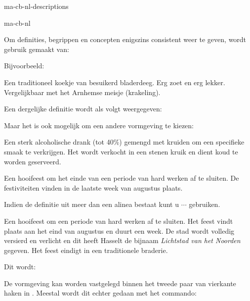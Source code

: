 \startonderdeel ma-cb-nl-descriptions

\produkt ma-cb-nl




Om definities, begrippen en concepten enigszins consistent
weer te geven, wordt gebruik gemaakt van:


Bijvoorbeeld:

\startbuffer
\doordefinieren
  [concept]
  [plaats=aanelkaar,kopletter=vet,breedte=ruim]

 Een traditioneel koekje van
besuikerd bladerdeeg. Erg zoet en erg lekker. Vergelijkbaar
met het Arnhemse meisje (krakeling). \par
\stopbuffer

\typebuffer

Een dergelijke definitie wordt als volgt weergegeven:

\haalbuffer

Maar het is ook mogelijk om een andere vormgeving te kiezen:

\startbuffer
\doordefinieren
  [concept]
  [plaats=boven,
   kopletter=vet,
   breedte=ruim,
   letter=schuin]

 Een sterk alcoholische drank (tot
40\%) gemengd met kruiden om een specifieke smaak te
verkrijgen. Het wordt verkocht in een stenen kruik en dient
koud te worden geserveerd. \par

\doordefinieren
  [concept]
  [plaats=inmarge,kopletter=vet,breedte=ruim]

 Een hooifeest om het einde van een periode
van hard werken af te sluiten. De festiviteiten vinden in de
laatste week van augustus plaats. \par
\stopbuffer

\start
\haalbuffer
\stop

Indien de definitie uit meer dan een alinea bestaat kunt u
 $\cdots$  gebruiken.

\startbuffer
\doordefinieren
  [concept]
  [plaats=rechts,
   kopletter=vet,
   breedte=ruim]

Een hooifeest om een periode van hard werken af te sluiten.
Het feest vindt plaats aan het eind van augustus en duurt
een week.
De stad wordt volledig versierd en verlicht en dit heeft
Hasselt de bijnaam {\em Lichtstad van het Noorden} gegeven.
Het feest eindigt in een traditionele braderie.
\stopconcept
\stopbuffer

\typebuffer

Dit wordt:

\haalbuffer

De vormgeving kan worden vastgelegd binnen het tweede paar
van vierkante haken in \type{\doordefinieren[][]}. Meestal
wordt dit echter gedaan met het commando:


\stoponderdeel

